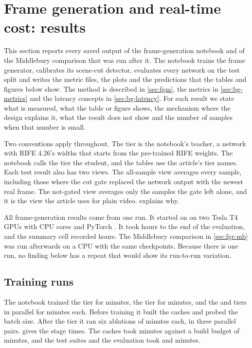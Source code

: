 \section{Frame generation and real-time cost: results}\label{sec:fgr}

This section reports every saved output of the frame-generation notebook and of the Middlebury comparison that was run after it. The notebook trains the frame generator, calibrates its scene-cut detector, evaluates every network on the test split and writes the metric files, the plots and the predictions that the tables and figures below show. The method is described in \cref{sec:fgm}, the metrics in \cref{sec:bg-metrics} and the latency concepts in \cref{sec:bg-latency}. For each result we state what is measured, what the table or figure shows, the mechanism where the design explains it, what the result does not show and the number of samples when that number is small.

Two conventions apply throughout. The  tier is the notebook's teacher, a network with RIFE 4.26's widths that starts from the pre-trained RIFE weights. The notebook calls the  tier the student, and the tables use the article's tier names. Each test result also has two views. The all-sample view averages every sample, including those where the cut gate replaced the network output with the newest real frame. The not-gated view averages only the samples the gate left alone, and it is the view the article uses for plain video.  explains why.

\Preliminary{} All frame-generation results come from one run. It started on  on two Tesla T4 GPUs with  CPU cores and PyTorch . It took  hours to the end of the evaluation, and the summary cell recorded  hours. The Middlebury comparison in \cref{sec:fgr-mb} was run afterwards on a CPU with the same checkpoints. Because there is one run, no finding below has a repeat that would show its run-to-run variation.

\subsection{Training runs}\label{sec:fgr-train}

The notebook trained the  tier for  minutes, the  tier for  minutes, and the  and  tiers in parallel for  minutes each. Before training it built the caches and probed the batch size. After the  tier it ran six ablations of  minutes each, in three parallel pairs.  gives the stage times. The caches took  minutes against a build budget of  minutes, and the test suites and the evaluation took  and  minutes.

